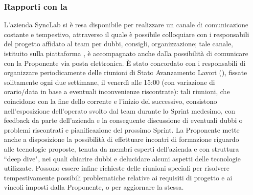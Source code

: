 \subsubsection{Rapporti con la }
L'azienda SyncLab si è resa disponibile per realizzare un canale di comunicazione costante e
tempestivo, attraverso il quale è possibile colloquiare con i responsabili del progetto affidato al
team per dubbi, consigli, organizzazione; tale canale, istituito sulla piattaforma
, è accompagnato anche dalla possibilità di comunicare con la Proponente via
posta elettronica. È stato concordato con i responsabili di organizzare periodicamente delle
riunioni di Stato Avanzamento Lavori (), fissate solitamente ogni due settimane, il
venerdì alle 15:00 (con variazione di orario/data in base a eventuali inconvenienze riscontrate):
tali riunioni, che coincidono con la fine dello  corrente e l'inizio del
successivo, consistono nell'esposizione dell'operato svolto dal team durante lo Sprint medesimo, con
feedback da parte dell'azienda e la conseguente discussione di eventuali dubbi o problemi
riscontrati e pianificazione del prossimo Sprint.
La Proponente mette anche a disposizione la possibilità di effettuare incontri di formazione
riguardo alle tecnologie proposte, tenuta da membri esperti dell'azienda e con struttura ``deep
dive", nei quali chiarire dubbi e delucidare alcuni aspetti delle tecnologie utilizzate. 
Possono essere infine richieste delle riunioni speciali per risolvere tempestivamente possibili
problematiche relative ai requisiti di progetto e ai vincoli imposti dalla Proponente, o per
aggiornare la stessa.
\clearpage
